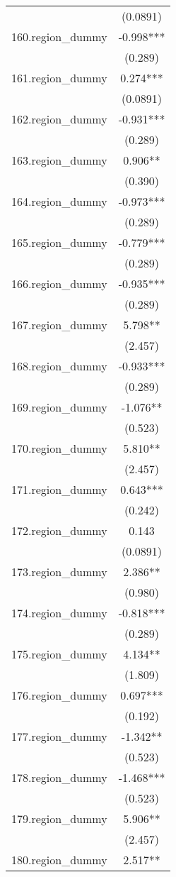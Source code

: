 \documentclass[]{article}
\begin{document}
\begin{tabular}{lc}
 & (0.0891) \\
160.region\_dummy & -0.998*** \\
 & (0.289) \\
161.region\_dummy & 0.274*** \\
 & (0.0891) \\
162.region\_dummy & -0.931*** \\
 & (0.289) \\
163.region\_dummy & 0.906** \\
 & (0.390) \\
164.region\_dummy & -0.973*** \\
 & (0.289) \\
165.region\_dummy & -0.779*** \\
 & (0.289) \\
166.region\_dummy & -0.935*** \\
 & (0.289) \\
167.region\_dummy & 5.798** \\
 & (2.457) \\
168.region\_dummy & -0.933*** \\
 & (0.289) \\
169.region\_dummy & -1.076** \\
 & (0.523) \\
170.region\_dummy & 5.810** \\
 & (2.457) \\
171.region\_dummy & 0.643*** \\
 & (0.242) \\
172.region\_dummy & 0.143 \\
 & (0.0891) \\
173.region\_dummy & 2.386** \\
 & (0.980) \\
174.region\_dummy & -0.818*** \\
 & (0.289) \\
175.region\_dummy & 4.134** \\
 & (1.809) \\
176.region\_dummy & 0.697*** \\
 & (0.192) \\
177.region\_dummy & -1.342** \\
 & (0.523) \\
178.region\_dummy & -1.468*** \\
 & (0.523) \\
179.region\_dummy & 5.906** \\
 & (2.457) \\
180.region\_dummy & 2.517** \\

\end{tabular}
\end{document}
